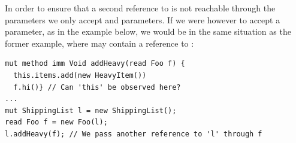 In order to ensure that a second reference to \Q@this@ is not reachable through the parameters we only accept \Q@imm@ and \Q@capsule@ parameters.
If we were however to accept a \Q@read@ parameter, as in the example below,
we would be in the same situation as the former example, where \Q@f@ may contain
a reference to \Q@this@:
\saveSpace
\begin{lstlisting}
mut method imm Void addHeavy(read Foo f) {
  this.items.add(new HeavyItem())
  f.hi()} // Can 'this' be observed here?
...
mut ShippingList l = new ShippingList();
read Foo f = new Foo(l);
l.addHeavy(f); // We pass another reference to 'l' through f
\end{lstlisting}
\saveSpace



